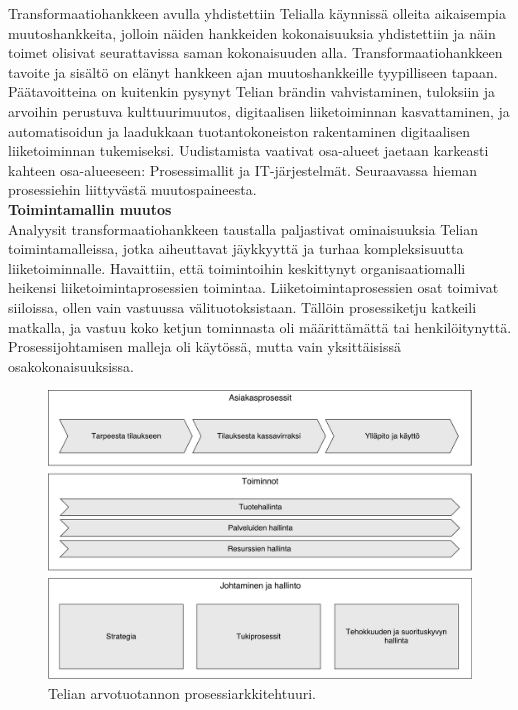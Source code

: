 \documentclass[finnish,12pt,a4paper,pdftex]{article}
\begin{document}
Transformaatiohankkeen avulla yhdistettiin Telialla käynnissä olleita aikaisempia muutoshankkeita, jolloin näiden hankkeiden kokonaisuuksia yhdistettiin ja näin toimet olisivat seurattavissa saman kokonaisuuden alla. Transformaatiohankkeen tavoite ja sisältö on elänyt hankkeen ajan muutoshankkeille tyypilliseen tapaan. Päätavoitteina on kuitenkin pysynyt Telian brändin vahvistaminen, tuloksiin ja arvoihin perustuva kulttuurimuutos, digitaalisen liiketoiminnan kasvattaminen, ja automatisoidun ja laadukkaan tuotantokoneiston rakentaminen digitaalisen liiketoiminnan tukemiseksi. Uudistamista vaativat osa-alueet jaetaan karkeasti kahteen osa-alueeseen: Prosessimallit ja IT-järjestelmät. Seuraavassa hieman prosessiehin liittyvästä muutospaineesta.\\

\textbf{Toimintamallin muutos}\\

\noindent Analyysit transformaatiohankkeen taustalla paljastivat ominaisuuksia Telian toimintamalleissa, jotka aiheuttavat jäykkyyttä ja turhaa kompleksisuutta liiketoiminnalle. Havaittiin, että toimintoihin keskittynyt organisaatiomalli heikensi liiketoimintaprosessien toimintaa. Liiketoimintaprosessien osat toimivat siiloissa, ollen vain vastuussa välituotoksistaan. Tällöin prosessiketju katkeili matkalla, ja vastuu koko ketjun tominnasta oli määrittämättä tai henkilöitynyttä. Prosessijohtamisen malleja oli käytössä, mutta vain yksittäisissä osakokonaisuuksissa.\\


\begin{figure}[!h]
    \centering
    \includegraphics[scale=0.4]{images/prosessiarkkitehtuuri.pdf}
    \caption{Telian arvotuotannon prosessiarkkitehtuuri.}
    \label{fig:prosark}
\end{figure}
\end{document}
